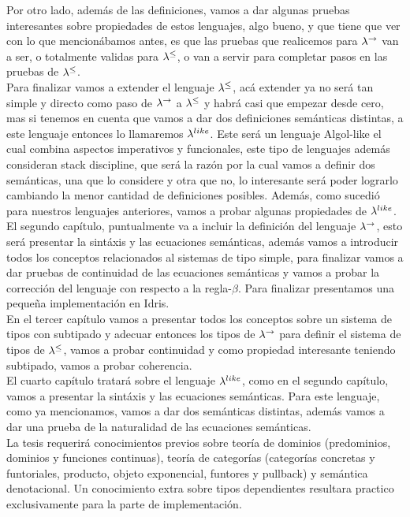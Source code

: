 Por otro lado, adem\'as de las definiciones, vamos a dar algunas pruebas
interesantes sobre propiedades de estos lenguajes, algo bueno, y que tiene
que ver con lo que mencion\'abamos antes, es que las pruebas que realicemos
para $\lambda^{\rightarrow}$ van a ser, o totalmente validas para $\lambda^{\leq}$, o
van a servir para completar pasos en las pruebas de $\lambda^{\leq}$.\\

Para finalizar vamos a extender el lenguaje $\lambda^{\leq}$, ac\'a extender
ya no ser\'a tan simple y directo como paso de $\lambda^{\rightarrow}$ a $\lambda^{\leq}$
y habr\'a casi que empezar desde cero, mas si tenemos en cuenta que vamos a
dar dos definiciones sem\'anticas distintas, a este lenguaje entonces lo 
llamaremos $\lambda^{like}$. Este ser\'a un lenguaje Algol-like el cual
combina aspectos imperativos y funcionales, este tipo de lenguajes adem\'as
consideran stack discipline, que ser\'a la raz\'on por la cual vamos a
definir dos sem\'anticas, una que lo considere y otra
que no, lo interesante ser\'a poder lograrlo cambiando la menor
cantidad de definiciones posibles. Adem\'as, como sucedi\'o para nuestros
lenguajes anteriores, vamos a probar algunas propiedades de $\lambda^{like}$.\\

El segundo cap\'itulo, puntualmente va a incluir la definici\'on del lenguaje
$\lambda^{\rightarrow}$, esto ser\'a presentar la sint\'axis y las ecuaciones
sem\'anticas, adem\'as vamos a introducir todos los conceptos relacionados al 
sistemas de tipo simple, para finalizar vamos a dar pruebas de
continuidad de las ecuaciones sem\'anticas y vamos a probar la correcci\'on
del lenguaje con respecto a la regla-$\beta$. Para finalizar presentamos
una pequeña implementaci\'on en Idris.\\

En el tercer cap\'itulo vamos a presentar todos los conceptos sobre
un sistema de tipos con subtipado y adecuar entonces los tipos de $\lambda^{\rightarrow}$
para definir el sistema de tipos de $\lambda^{\leq}$, vamos a probar
continuidad y como propiedad interesante teniendo subtipado, vamos a probar
coherencia.\\

El cuarto cap\'itulo tratar\'a sobre el lenguaje $\lambda^{like}$, como en el segundo
cap\'itulo, vamos a presentar la sint\'axis y las ecuaciones sem\'anticas. Para
este lenguaje, como ya mencionamos, vamos a dar dos sem\'anticas distintas, adem\'as
vamos a dar una prueba de la naturalidad de las ecuaciones sem\'anticas.\\

La tesis requerir\'a conocimientos previos sobre teor\'ia de dominios 
(predominios, dominios y funciones continuas), teor\'ia
de categor\'ias (categor\'ias concretas y funtoriales, producto, 
objeto exponencial, funtores y pullback) y sem\'antica denotacional. Un
conocimiento extra sobre tipos dependientes resultara practico exclusivamente
para la parte de implementaci\'on.

